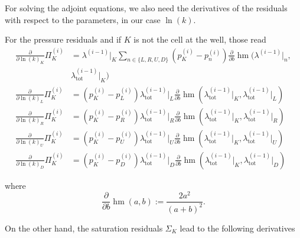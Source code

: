 \documentclass[conference]{IEEEtran}
\newcommand*{\pdiff}[2]{\ensuremath{\frac{\partial}{\partial{#2}}{#1}}}
\DeclareMathOperator*{\hmean}{hm}
\begin{document}
For solving the adjoint equations, we also need the derivatives of the residuals with respect to the parameters, in our case $\ln(k).$

For the pressure residuals and if $K$ is not the cell at the well, those read\\
\begin{align}
\pdiff{\Pi_K^{(i)}}{\ln(k)_K} &= \lambda^{(i-1)}\lvert_K\sum_{n\in\{L, R, U, D\}} (p_K^{(i)} - p_n^{(i)})\pdiff{\hmean}{b}(\lambda^{(i-1)}\lvert_n,\\& \lambda_\text{tot}^{(i-1)}\lvert_K)\nonumber\\
\pdiff{\Pi_K^{(i)}}{\ln(k)_L} &= (p_K^{(i)} - p_L^{(i)})\lambda_\text{tot}^{(i-1)}\lvert_L \pdiff{\hmean}{b}(\lambda_\text{tot}^{(i-1)}\lvert_K, \lambda_\text{tot}^{(i-1)}\lvert_L) \\
\pdiff{\Pi_K^{(i)}}{\ln(k)_R} &= (p_K^{(i)} - p_R^{(i)})\lambda_\text{tot}^{(i-1)}\lvert_R \pdiff{\hmean}{b}(\lambda_\text{tot}^{(i-1)}\lvert_K, \lambda_\text{tot}^{(i-1)}\lvert_R) \\
\pdiff{\Pi_K^{(i)}}{\ln(k)_U} &= (p_K^{(i)} - p_U^{(i)})\lambda_\text{tot}^{(i-1)}\lvert_U \pdiff{\hmean}{b}(\lambda_\text{tot}^{(i-1)}\lvert_K, \lambda_\text{tot}^{(i-1)}\lvert_U) \\
\pdiff{\Pi_K^{(i)}}{\ln(k)_D} &= (p_K^{(i)} - p_D^{(i)})\lambda_\text{tot}^{(i-1)}\lvert_D \pdiff{\hmean}{b}(\lambda_\text{tot}^{(i-1)}\lvert_K, \lambda_\text{tot}^{(i-1)}\lvert_D)
\end{align}

where 
\begin{equation}
\pdiff{\hmean}{b}(a, b) := \frac{2a^2}{(a+b)^2}.
\end{equation}

On the other hand, the saturation residuals $\Sigma_K$ lead to the following derivatives
\end{document}
